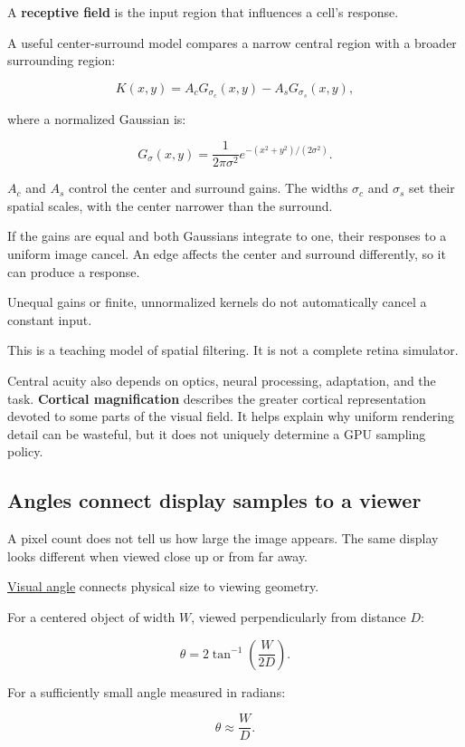 A \textbf{receptive field} is the input region that influences a cell's response.

A useful center-surround model compares a narrow central region with a broader surrounding region:

\[
K(x,y)=A_cG_{\sigma_c}(x,y)-A_sG_{\sigma_s}(x,y),
\]

where a normalized Gaussian is:

\[
G_\sigma(x,y)=
\frac{1}{2\pi\sigma^2}
e^{-(x^2+y^2)/(2\sigma^2)}.
\]

\(A_c\) and \(A_s\) control the center and surround gains. The widths \(\sigma_c\) and \(\sigma_s\) set their spatial scales, with the center narrower than the surround.

If the gains are equal and both Gaussians integrate to one, their responses to a uniform image cancel. An edge affects the center and surround differently, so it can produce a response.

Unequal gains or finite, unnormalized kernels do not automatically cancel a constant input.

This is a teaching model of spatial filtering. It is not a complete retina simulator.

Central acuity also depends on optics, neural processing, adaptation, and the task. \textbf{Cortical magnification} describes the greater cortical representation devoted to some parts of the visual field. It helps explain why uniform rendering detail can be wasteful, but it does not uniquely determine a GPU sampling policy.

\subsection{Angles connect display samples to a viewer}\label{04-visual-computing-ii-ch043-angles-connect-display-samples-to-a-viewer}

A pixel count does not tell us how large the image appears. The same display looks different when viewed close up or from far away.

\hyperref[appendix-7d356c396d1a]{Visual angle} connects physical size to viewing geometry.

For a centered object of width \(W\), viewed perpendicularly from distance \(D\):

\[
\theta=2\tan^{-1}\left(\frac{W}{2D}\right).
\]

For a sufficiently small angle measured in radians:

\[
\theta\approx\frac{W}{D}.
\]

